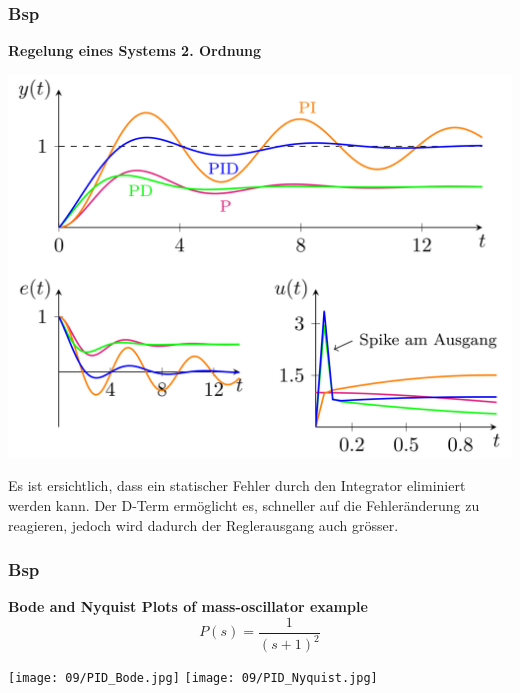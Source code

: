         \subsubsection{Bsp}
            \textbf{Regelung eines Systems 2. Ordnung}
            \begin{center}
                \includegraphics[width =\linewidth]{images/09/Bsp_PID.png}
            \end{center}
            Es ist ersichtlich, dass ein statischer Fehler durch den Integrator eliminiert werden kann. Der D-Term ermöglicht es, schneller auf die Fehleränderung zu reagieren, jedoch wird dadurch der Reglerausgang auch grösser.
\vfill\null\columnbreak            
        \subsubsection{Bsp}
            \textbf{Bode and Nyquist Plots of mass-oscillator example}
            \[P(s)=\frac{1}{(s+1)^2}\]
            \begin{center}
                \texttt{[image: 09/PID\_Bode.jpg]}
                \texttt{[image: 09/PID\_Nyquist.jpg]}
            \end{center}
